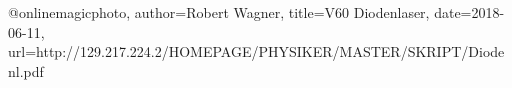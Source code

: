 @online{magicphoto,
    author={Robert Wagner},
    title={V60 Diodenlaser},
    date={2018-06-11},
    url={http://129.217.224.2/HOMEPAGE/PHYSIKER/MASTER/SKRIPT/Diodenl.pdf}
}

